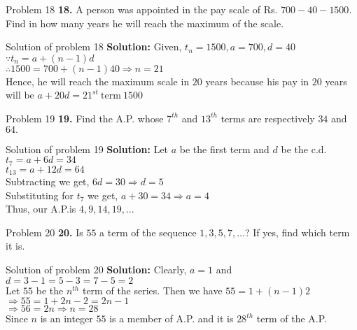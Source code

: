 \documentclass[aspectratio=1610,8pt]{beamer}
\begin{document}
\begin{frame}{Problem 18}
  \textbf{18.} A person was appointed in the pay scale of Rs. $700 - 40 -
  1500.$ Find in how many years he will reach the maximum of the scale.
\end{frame}
\begin{frame}{Solution of problem 18}
  \textbf{Solution:} Given, $t_n = 1500, a = 700, d = 40$\\
  $\because t_n = a + (n - 1)d$\\
  $\therefore 1500 = 700 + (n - 1)40 \Rightarrow n = 21$\\
  Hence, he will reach the maximum scale in $20$ years because his pay in $20$
  years will be $a + 20d = 21^{st}~\text{term}~1500$
\end{frame}
\begin{frame}{Problem 19}
  \textbf{19.} Find the A.P. whose $7^{th}$ and $13^{th}$ terms are respectively $34$ and $64.$
\end{frame}
\begin{frame}{Solution of problem 19}
  \textbf{Solution:} Let $a$ be the first term and $d$ be the c.d.\\
  $t_7 = a + 6d = 34$\\
  $t_{13} = a + 12d = 64$\\
  Subtracting we get, $6d =30 \Rightarrow d = 5$\\
  Substituting for $t_7$ we get, $a + 30 = 34 \Rightarrow a = 4$\\
  Thus, our A.P.is $4, 9, 14, 19, \ldots$
\end{frame}
\begin{frame}{Problem 20}
  \textbf{20.} Is $55$ a term of the sequence $1, 3, 5, 7, \ldots$? If yes,
  find which term it is.
\end{frame}
\begin{frame}{Solution of problem 20}
  \textbf{Solution:} Clearly, $a = 1$ and $d = 3 - 1 = 5 - 3 = 7 - 5 = 2$\\
  Let $55$ be the $n^{th}$ term of the series. Then we have $55 = 1 + (n - 1)2$\\
  $\Rightarrow 55 = 1 + 2n - 2 = 2n - 1$\\
  $\Rightarrow 56 = 2n \Rightarrow n = 28$\\
  Since $n$ is an integer $55$ is a member of A.P. and it is $28^{th}$ term of
  the A.P.
\end{frame}
\end{document}
